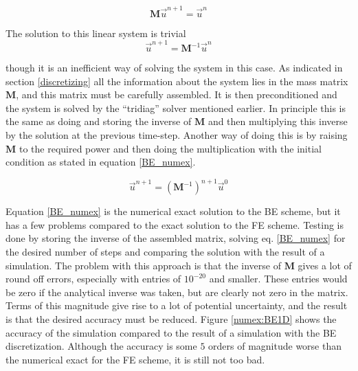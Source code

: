 \begin{equation*}
 \mathbf M \vec u^{n+1} = \vec u^n
\end{equation*}

The solution to this linear system is trivial
\begin{equation*}
 \vec u^{n+1} = \mathbf M^{-1} \vec u^n
\end{equation*}

though it is an inefficient way of solving the system in this case. 
As indicated in section \ref{discretizing} all the information about the system lies in the mass matrix $\mathbf M$, and this matrix must be carefully assembled. 
It is then preconditioned and the system is solved by the ``tridiag'' solver mentioned earlier. 
In principle this is the same as doing and storing the inverse of $\mathbf M$ and then multiplying this inverse by the solution at the previous time-step. 
Another way of doing this is by raising $\mathbf M$ to the required power and then doing the multiplication with the initial condition as stated in equation \eqref{BE_numex}.

\begin{equation}\label{BE_numex}
 \vec u^{n+1} = \left(\mathbf M^{-1}\right)^{n+1} \vec u^0
\end{equation}

Equation \eqref{BE_numex} is the numerical exact solution to the BE scheme, but it has a few problems compared to the exact solution to the FE scheme. 
Testing is done by storing the inverse of the assembled matrix, solving eq. \eqref{BE_numex} for the desired number of steps and comparing the solution with the result of a simulation. 
The problem with this approach is that the inverse of $\mathbf M$ gives a lot of round off errors, especially with entries of $10^{-20}$ and smaller. 
These entries would be zero if the analytical inverse was taken, but are clearly not zero in the matrix. 
Terms of this magnitude give rise to a lot of potential uncertainty, and the result is that the desired accuracy must be reduced. 
Figure \ref{numex:BE1D} shows the accuracy of the simulation compared to the result of a simulation with the BE discretization. 
Although the accuracy is some $5$ orders of magnitude worse than the numerical exact for the FE scheme, it is still not too bad. 

